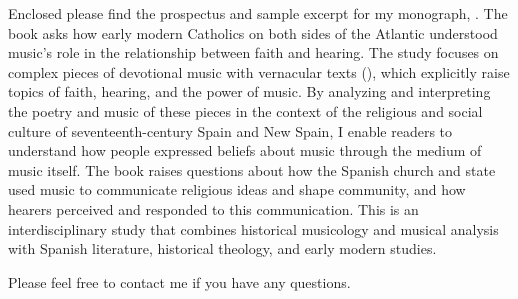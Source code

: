 Enclosed please find the prospectus and sample excerpt for my monograph,
.
The book asks how early modern Catholics on both sides of the Atlantic
understood music's role in the relationship between faith and hearing.
The study focuses on complex pieces of devotional music with vernacular texts
(), which explicitly raise topics of faith, hearing, and the
power of music.
By analyzing and interpreting the poetry and music of these pieces in the
context of the religious and social culture of seventeenth-century Spain and New
Spain, I enable readers to understand how people expressed beliefs about music
through the medium of music itself.
The book raises questions about how the Spanish church and state used music to
communicate religious ideas and shape community, and how hearers perceived and
responded to this communication.
This is an interdisciplinary study that combines historical musicology and
musical analysis with Spanish literature, historical theology, and early modern
studies.

Please feel free to contact me if you have any questions.
\endinput
